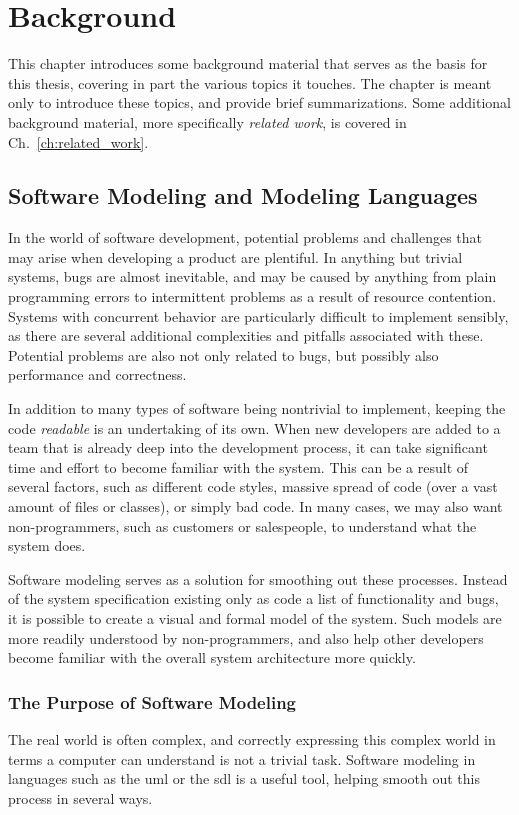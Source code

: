 \chapter{Background}
\label{ch:background}
This chapter introduces some background material that serves as the basis for this thesis, covering in part the various topics it touches. The chapter is meant only to introduce these topics, and provide brief summarizations. Some additional background material, more specifically \emph{related work}, is covered in Ch.~\ref{ch:related_work}. 

\section{Software Modeling and Modeling Languages}
\label{sec:software_modeling}
In the world of software development, potential problems and challenges that may arise when developing a product are plentiful. In anything but trivial systems, bugs are almost inevitable, and may be caused by anything from plain programming errors to intermittent problems as a result of resource contention. Systems with concurrent behavior are particularly difficult to implement sensibly, as there are several additional complexities and pitfalls associated with these. Potential problems are also not only related to bugs, but possibly also performance and correctness.

\noindent
In addition to many types of software being nontrivial to implement, keeping the code \emph{readable} is an undertaking of its own. When new developers are added to a team that is already deep into the development process, it can take significant time and effort to become familiar with the system. This can be a result of several factors, such as different code styles, massive spread of code (over a vast amount of files or classes), or simply bad code. In many cases, we may also want non-programmers, such as customers or salespeople, to understand what the system does.

\noindent
Software modeling serves as a solution for smoothing out these processes. Instead of the system specification existing only as code a list of functionality and bugs, it is possible to create a visual and formal model of the system. Such models are more readily understood by non-programmers, and also help other developers become familiar with the overall system architecture more quickly.

\subsection{The Purpose of Software Modeling}
\label{sec:software_modeling_purpose}
The real world is often complex, and correctly expressing this complex world in terms a computer can understand is not a trivial task. Software modeling in languages such as the \gls{uml} or the \gls{sdl} is a useful tool, helping smooth out this process in several ways.

